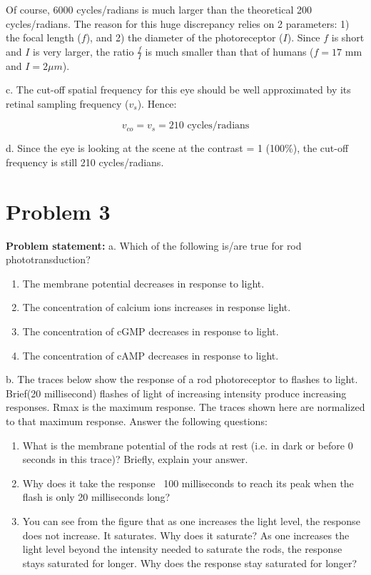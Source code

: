 \documentclass[letterpaper, 11pt]{article}
\begin{document}
Of course, 6000 cycles/radians is much larger than the theoretical 200 cycles/radians. The reason for this huge discrepancy relies on 2 parameters: 1) the focal length ($f$), and 2) the diameter of the photoreceptor ($I$). Since $f$ is short and $I$ is very larger, the ratio $\frac{f}{I}$ is much smaller than that of humans ($f = 17 \text{ mm}$ and $I = 2 \mu m$). 

c. The cut-off spatial frequency for this eye should be well approximated by its retinal sampling frequency ($v_s$). Hence:

\begin{equation}
	v_{co} = v_s = 210 \text{ cycles/radians}
\end{equation}

d. Since the eye is looking at the scene at the contrast = 1 (100\%), the cut-off frequency is still 210 cycles/radians.

\section{Problem 3}
\label{sec:prob3}
\textbf{Problem statement:} 
a. Which of the following is/are true for rod phototransduction?
\begin{enumerate}
	\item The membrane potential decreases in response to light.
	\item The concentration of calcium ions increases in response light.
	\item The concentration of cGMP decreases in response to light.
	\item The concentration of cAMP decreases in response to light.
\end{enumerate}
b. The traces below show the response of a rod photoreceptor to flashes to light. Brief(20 millisecond) flashes of light of increasing intensity produce increasing responses. Rmax is the maximum response. The traces shown here are normalized to that maximum response. Answer the following questions:
\begin{enumerate}
	\item What is the membrane potential of the rods at rest (i.e. in dark or before 0 seconds in this trace)? Briefly, explain your answer.
	\item Why does it take the response ~100 milliseconds to reach its peak when the flash is only 20 milliseconds long?
	\item You can see from the figure that as one increases the light level, the response does not increase. It saturates. Why does it saturate? As one increases the light level beyond the intensity needed to saturate the rods, the response stays saturated for longer. Why does the response stay saturated for longer?
\end{enumerate}
\end{document}
